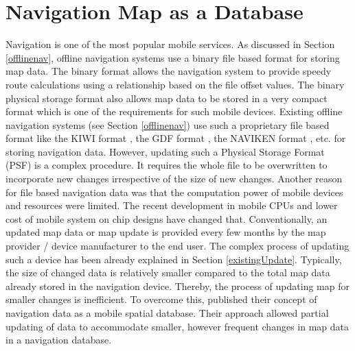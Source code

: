 \section{Navigation Map as a Database} \label{navasdb}
Navigation is one of the most popular mobile services. As discussed in Section \ref{offlinenav}, offline navigation systems use a binary file based format for storing map data. The binary format allows the navigation system to provide speedy route calculations using a relationship based on the file offset values. The binary physical storage format also allows map data to be stored in a very compact format which is one of the requirements for such mobile devices. Existing offline navigation systems (see Section \ref{offlinenav}) use such a proprietary file based format like the KIWI format \cite{kiwiinput}, the GDF format \cite{tc204200214825}, the NAVIKEN format \cite{bullock1994analysis}, etc. for storing navigation data. However, updating such a Physical Storage Format (PSF) is a complex procedure. It requires the whole file to be overwritten to incorporate new changes irrespective of the size of new changes. Another reason for file based navigation data was that the computation power of mobile devices and resources were limited. The recent development in mobile CPUs and lower cost of mobile system on chip designs have changed that. Conventionally, an updated map data or map update is provided every few months by the map provider / device manufacturer to the end user. The complex process of updating such a device has been already explained in Section \ref{existingUpdate}. Typically, the size of changed data is relatively smaller compared to the total map data already stored in the navigation device. Thereby, the process of updating map for smaller changes is inefficient. To overcome this, \citet{min2008mobile} published their concept of navigation data as a mobile spatial database. Their approach allowed partial updating of data to accommodate smaller, however frequent changes in map data in a navigation database. \\

